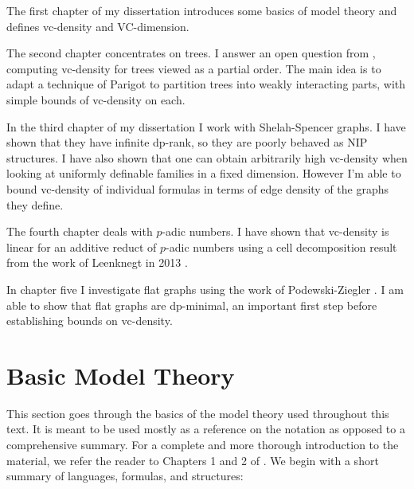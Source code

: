 The first chapter of my dissertation introduces some basics of model theory and defines vc-density and VC-dimension.

The second chapter concentrates on trees.
I answer an open question from \cite{density}, computing vc-density for trees viewed as a partial order.
The main idea is to adapt a technique of Parigot \cite{parigot_trees} to partition trees into weakly interacting parts, with simple bounds of vc-density on each.

In the third chapter of my dissertation I work with Shelah-Spencer graphs.
I have shown that they have infinite dp-rank, so they are poorly behaved as NIP structures.
I have also shown that one can obtain arbitrarily high vc-density when looking at uniformly definable families in a fixed dimension.
However I'm able to bound vc-density of individual formulas in terms of edge density of the graphs they define.

The fourth chapter deals with $p$-adic numbers.
I have shown that vc-density is linear for an additive reduct of $p$-adic numbers
using a cell decomposition result from the work of Leenknegt in 2013 \cite{reduct}.

In chapter five I investigate flat graphs using the work of
Podewski-Ziegler \cite {stable_graphs}.
I am able to show that flat graphs are dp-minimal, an important first step before establishing bounds on vc-density.

\section{Basic Model Theory}

This section goes through the basics of the model theory used throughout this text.
It is meant to be used mostly as a reference on the notation as opposed to a comprehensive summary.
For a complete and more thorough introduction to the material, we refer the reader to Chapters 1 and 2 of \cite{tent}.
We begin with a short summary of languages, formulas, and structures:

